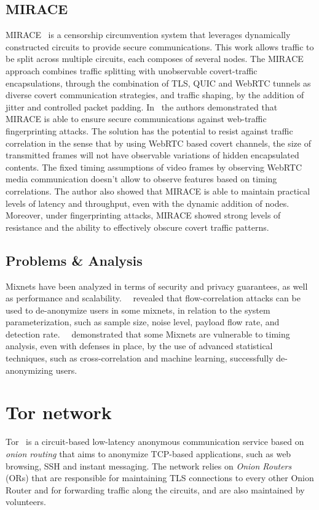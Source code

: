 \subsection{MIRACE}\label{subsec:mirace}
MIRACE~\cite{MIRACE} is a censorship circumvention system that leverages dynamically constructed circuits to provide secure communications. This work allows traffic to be split across multiple circuits, each composes of several nodes. The MIRACE approach combines traffic splitting with unobservable covert-traffic encapsulations, through the combination of TLS, QUIC and WebRTC tunnels as diverse covert communication strategies, and traffic shaping, by the addition of jitter and controlled packet padding. In~\cite{MIRACE} the authors demonstrated that MIRACE is able to ensure secure communications against web-traffic fingerprinting attacks. The solution has the potential to resist against traffic correlation in the sense that by using WebRTC based covert channels, the size of transmitted frames will not have observable variations of hidden encapsulated contents. The fixed timing assumptions of video frames by observing WebRTC media communication doesn't allow to observe features based on timing correlations. The author also showed that MIRACE is able to maintain practical levels of latency and throughput, even with the dynamic addition of nodes. Moreover, under fingerprinting attacks, MIRACE showed strong levels of resistance and the ability to effectively obscure covert traffic patterns.
 
\subsection{Problems \& Analysis}\label{sec:problems_analysis}
Mixnets have been analyzed in terms of security and privacy guarantees, as well as performance and scalability.~\citeauthor{AnalysisMixNetsYeZhu}~\cite{AnalysisMixNetsYeZhu} revealed that flow-correlation attacks can be used to de-anonymize users in some mixnets, in relation to the system parameterization, such as sample size, noise  level, payload flow rate, and detection rate.~\citeauthor{TrafficAnalysisLowMixnet}~\cite{TrafficAnalysisLowMixnet} demonstrated that some Mixnets are vulnerable to timing analysis, even with defenses in place, by the use of advanced statistical techniques, such as cross-correlation and machine learning, successfully de-anonymizing users.

\section{Tor network}\label{sec:tor_network}
Tor~\cite{dingledine2004tor} is a circuit-based low-latency anonymous communication service based on \textit{onion routing} that aims to anonymize TCP-based applications, such as web browsing, SSH and instant messaging. The network relies on \textit{Onion Routers} (ORs) that are responsible for maintaining TLS connections to every other Onion Router and for forwarding traffic along the circuits, and are also maintained by volunteers.

